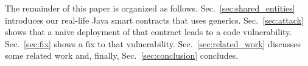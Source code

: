The remainder of this paper is organized as follows.
Sec.~\ref{sec:shared_entities} introduces our real-life Java smart
contracts that uses generics. Sec.~\ref{sec:attack} shows that a na\"{i}ve
deployment of that contract leads to a code vulnerability.
Sec.~\ref{sec:fix} shows a fix to that vulnerability.
Sec.~\ref{sec:related_work} discusses some related work and, finally,
Sec.~\ref{sec:conclusion} concludes.


